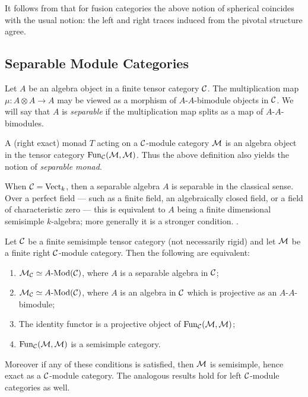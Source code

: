\documentclass{amsart}
\begin{document}
\begin{remark}
	It follows from \cite[Cor. 7.4]{MR2097289} that for fusion categories the above notion of spherical coincides with the usual notion: the left and right traces induced from the pivotal structure agree.
\end{remark}

 

\subsection{Separable Module Categories} \label{sec-tc-separable}


\begin{definition}
	Let $A$ be an algebra object in a finite tensor category $\mathcal C$. The multiplication map $\mu: A \otimes A \to A$ may be viewed as a morphism of $A$-$A$-bimodule objects in $\mathcal C$. We will say that $A$ is {\em separable} if the multiplication map splits as a map of $A$-$A$-bimodules. 
\end{definition}

\begin{remark}
	A (right exact) monad $T$ acting on a $\mathcal C$-module category $\mathcal M$ is an algebra object in the tensor category $\operatorname{Fun}_\mathcal C(\mathcal M, \mathcal M)$. Thus the above definition also yields the notion of {\em separable monad}. 
\end{remark}

\begin{remark}
	When $\mathcal C = \mathrm{Vect}_k$, then a separable algebra $A$ is separable in the classical sense. Over a perfect field --- such as a finite field, an algebraically closed field, or a field of characteristic zero --- this is equivalent to $A$ being a finite dimensional semisimple $k$-algebra; more generally it is a stronger condition. 
	.
\end{remark}

\begin{theorem} \label{thm:SepModCats}
	Let $\mathcal C$ be a finite semisimple tensor category (not necessarily rigid) and let $\mathcal M$ be a finite right $\mathcal C$-module category. Then the following are equivalent:
	\begin{enumerate}
		\item $\cM_\cC \simeq \Mod{A}{}(\cC)$, where $A$ is a separable algebra in $\mathcal C$;
		\item $\cM_\cC \simeq \Mod{A}{}(\cC)$, where $A$ is an algebra in $\mathcal C$ which is projective as an $A$-$A$-bimodule;
		\item The identity functor is a projective object of $\operatorname{Fun}_\mathcal C(\mathcal M, \mathcal M)$;
		\item $\operatorname{Fun}_\mathcal C(\mathcal M, \mathcal M)$ is a semisimple category. 
	\end{enumerate}
	Moreover if any of these conditions is satisfied, then $\mathcal M$ is semisimple, hence exact as a $\mathcal C$-module category. The analogous results hold for left $\mathcal C$-module categories as well. 
\end{theorem}
\end{document}
